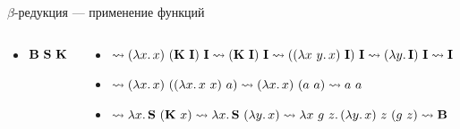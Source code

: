 \begin{frame}{$\beta$-редукция --- применение функций}
\begin{columns}[onlytextwidth]
\begin{column}[t]{0.3\textwidth}
\begin{itemize}
                    \item[\todo] $\mathbf{B}~\mathbf{S}~\mathbf{K}$
                \end{itemize}
            \end{column}\hfill%
            \begin{column}[t]{0.7\textwidth}
                \begin{itemize}
                    \item[\answer] \pause $\rightsquigarrow(\lambda x\ldotp x)~(\mathbf{K}~\mathbf{I})~\mathbf{I}\rightsquigarrow (\mathbf{K}~\mathbf{I})~\mathbf{I} \rightsquigarrow ((\lambda x~y\ldotp x)~\mathbf{I})~\mathbf{I} \rightsquigarrow (\lambda y\ldotp \mathbf{I})~ \mathbf{I} \rightsquigarrow \mathbf{I}$
                    \item[\answer] \pause $\rightsquigarrow (\lambda x\ldotp x)~((\lambda x\ldotp x~ x)~ a) \rightsquigarrow (\lambda x\ldotp x)~(a~ a) \rightsquigarrow a~ a$
                    \item[\answer] \pause $\rightsquigarrow \lambda x\ldotp \mathbf{S}~(\mathbf{K} ~ x) \rightsquigarrow \lambda x\ldotp\mathbf{S}~ (\lambda y\ldotp x) \rightsquigarrow \lambda x~g~z\ldotp (\lambda y\ldotp x)~ z~ (g~ z) \rightsquigarrow \mathbf{B}$
                \end{itemize}
            \end{column}
        \end{columns}
    \end{frame}

